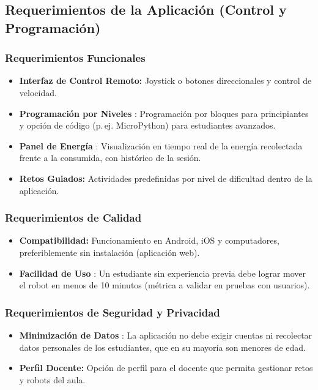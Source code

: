 \documentclass[11pt]{article}
\begin{document}
\subsection{Requerimientos de la Aplicación (Control y Programación)}
 
\subsubsection{Requerimientos Funcionales}
\begin{itemize}
  \item \textbf{Interfaz de Control Remoto:} Joystick o botones direccionales y control de velocidad.
  \item \textbf{Programación por Niveles} : Programación por bloques para principiantes y opción de código (p.\,ej. MicroPython) para estudiantes avanzados.
  \item \textbf{Panel de Energía} : Visualización en tiempo real de la energía recolectada frente a la consumida, con histórico de la sesión.
  \item \textbf{Retos Guiados:} Actividades predefinidas por nivel de dificultad dentro de la aplicación.
\end{itemize}
 
\subsubsection{Requerimientos de Calidad}
\begin{itemize}
  \item \textbf{Compatibilidad:} Funcionamiento en Android, iOS y computadores, preferiblemente sin instalación (aplicación web).
  \item \textbf{Facilidad de Uso} : Un estudiante sin experiencia previa debe lograr mover el robot en menos de 10 minutos (métrica a validar en pruebas con usuarios).
\end{itemize}
 
\subsubsection{Requerimientos de Seguridad y Privacidad}
\begin{itemize}
  \item \textbf{Minimización de Datos} : La aplicación no debe exigir cuentas ni recolectar datos personales de los estudiantes, que en su mayoría son menores de edad.
  \item \textbf{Perfil Docente:} Opción de perfil para el docente que permita gestionar retos y robots del aula.
\end{itemize}
 
\end{document}
